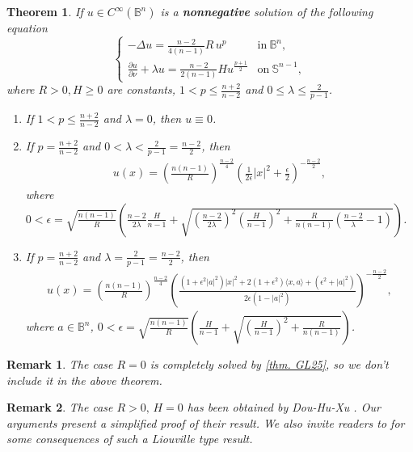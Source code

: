 \documentclass[12pt]{amsart}
\newtheorem{theorem}{Theorem}
\newtheorem{remark}{Remark}
\numberwithin{equation}{section}
\numberwithin{lemma}{section}
\numberwithin{proposition}{section}
\numberwithin{corollary}{section}
\numberwithin{remark}{section}
\begin{document}
    \begin{theorem}\label{thm. C.}
        If $u\in C^{\infty}(\mathbb{B}^n)$ is a \textbf{nonnegative} solution of the following equation
        \begin{equation}\label{eq. general equation of u-p}
            \begin{cases}
                -\Delta u=\frac{n-2}{4(n-1)}R\,u^{p} &\mathrm{ in} \ \mathbb{B}^n,\\
                \frac{\partial u}{\partial\nu}+\lambda u=\frac{n-2}{2(n-1)}Hu^{\frac{p+1}{2}} &\mathrm{on}\ \mathbb{S}^{n-1},
            \end{cases}
        \end{equation}
        where $R>0, H\geq 0$ are constants, $1<p\leq \frac{n+2}{n-2}$ and $0\leq \lambda\leq\frac{2}{p-1}$.
        \begin{enumerate}
            \item If  $1<p\leq \frac{n+2}{n-2}$ and $\lambda=0$, then $u\equiv 0$.
            \item If  $p=\frac{n+2}{n-2}$ and  $0<\lambda< \frac{2}{p-1}=\frac{n-2}{2}$, then 
            \begin{align*}
                u(x)=\left(\frac{n(n-1)}{R}\right)^{\frac{n-2}{4}}
                \left(
                \frac{1}{2\epsilon}|x|^2+\frac{\epsilon}{2}
                \right)^{-\frac{n-2}{2}},
            \end{align*}
            where $0<\epsilon=\sqrt{\frac{n(n-1)}{R}}
            \left(
            \frac{n-2}{2\lambda}\frac{H}{n-1}+\sqrt{(\frac{n-2}{2\lambda})^2(\frac{H}{n-1})^2+\frac{R}{n(n-1)}(\frac{n-2}{\lambda}-1)}
            \right)$.
            \item If  $p=\frac{n+2}{n-2}$ and $\lambda=\frac{2}{p-1}=\frac{n-2}{2}$, then 
            \begin{align*}
                u(x)
                =\left(\frac{n(n-1)}{R}\right)^{\frac{n-2}{4}}
                \left(
\frac{(1+\epsilon^2|a|^2)|x|^2+2(1+\epsilon^2)\langle x,a\rangle+(\epsilon^2+|a|^2)}{2\epsilon(1-|a|^2)}
            \right)^{-\frac{n-2}{2}},
            \end{align*}
            where $a\in \mathbb{B}^n$, $0<\epsilon
            =\sqrt{\frac{n(n-1)}{R}}
            \left(\frac{H}{n-1}+\sqrt{(\frac{H}{n-1})^2+\frac{R}{n(n-1)}}\right)$.
        \end{enumerate}
    \end{theorem}
    \begin{remark}
        The case $R=0$ is completely solved by \cref{thm. GL25}, so we don't include it in the above theorem.
    \end{remark}
    \begin{remark}
        The case $R>0,\, H=0$ has been obtained by Dou-Hu-Xu \cite[Theorem 1.1]{DHX}. Our arguments present a simplified proof of their result. We also invite readers to \cite{DHX} for some consequences of such a Liouville type result.
    \end{remark}
\end{document}
